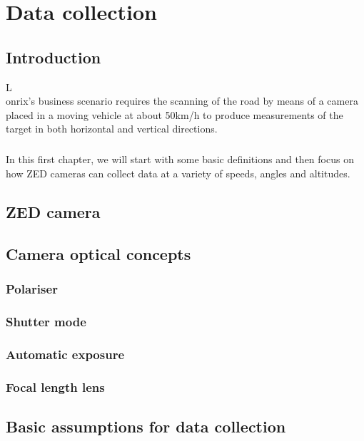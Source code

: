 \chapter{Data collection}

\section*{Introduction}
\lettrine[lines=2]{L}\\ onrix's business scenario requires the scanning of the road by means of a camera placed in a moving vehicle at about 50km/h to produce measurements of the target in both horizontal and vertical directions.

\paragraph*{}
In this first chapter, we will start with some basic definitions and then focus on how ZED cameras can collect data at a variety of speeds, angles and altitudes.

\section{ZED camera}
 

\section{Camera optical concepts}

\subsection{Polariser}

 \subsection{Shutter mode}
 
\subsection{Automatic exposure}
 
\subsection{Focal length lens}

 
\section{Basic assumptions for data collection}

